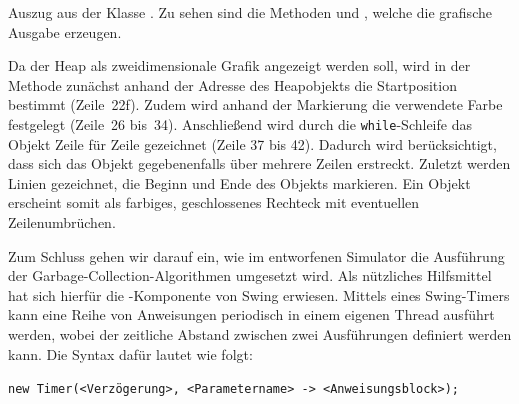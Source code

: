 \begin{listing}[p]
	\inputminted[]{java}{code/CanvasView.java}
	\caption[Auszug aus der Klasse ]{Auszug aus der Klasse . Zu sehen sind die Methoden  und , welche die grafische Ausgabe erzeugen.}
	\label{java:canvas}
\end{listing}

Da der Heap als zweidimensionale Grafik angezeigt werden soll, wird in der Methode  zunächst anhand der Adresse des Heapobjekts  die Startposition bestimmt (Zeile~22f).
Zudem wird anhand der Markierung die verwendete Farbe festgelegt (Zeile~26 bis~34).
Anschließend wird durch die \texttt{while}-Schleife das Objekt Zeile für Zeile gezeichnet (Zeile 37 bis 42).
Dadurch wird berücksichtigt, dass sich das Objekt gegebenenfalls über mehrere Zeilen erstreckt.
Zuletzt werden Linien gezeichnet, die Beginn und Ende des Objekts markieren.
Ein Objekt erscheint somit als farbiges, geschlossenes Rechteck mit eventuellen Zeilenumbrüchen.

Zum Schluss gehen wir darauf ein, wie im entworfenen Simulator die Ausführung der Garbage-Collection-Algorithmen umgesetzt wird.
Als nützliches Hilfsmittel hat sich hierfür die -Komponente von Swing erwiesen.
Mittels eines Swing-Timers kann eine Reihe von Anweisungen periodisch in einem eigenen Thread ausführt werden, wobei der zeitliche Abstand zwischen zwei Ausführungen definiert werden kann.
Die Syntax dafür lautet wie folgt:

\vspace*{-0.5cm}
\begin{center}
	\texttt{new Timer(<Verzögerung>, <Parametername> -> <Anweisungsblock>);}
\end{center}

